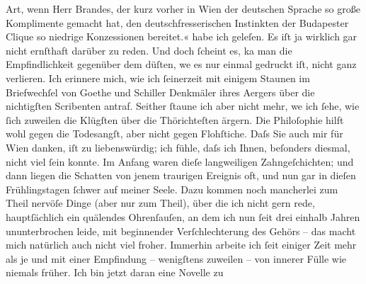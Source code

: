 \begin{ledgroupsized}[t]{13cm}
{{{                     Art, wenn Herr Brandes, der kurz vorher
                     in Wien der deutschen Sprache so große
                     Komplimente gemacht hat, den deutschfresserischen Instinkten der Budapester Clique so niedrige Konzessionen
                     bereitet.«}}}\label{K_L01034_4h} habe ich geleſen. Es iſt ja wirklich gar nicht
               ernſthaft darüber zu reden. Und doch ſcheint es, ka{\geminationn} man
               die Empfindlichkeit gegenüber dem dü{\geminationm}ſten, we{\geminationn} es nur einmal gedruckt iſt, nicht ganz verlieren. Ich
               erinnere mich, wie ich ſeinerzeit mit einigem Staunen im Briefwechſel von Goethe und Schiller Denkmäler ihres Aergers über die nichtigſten Scribenten antraf.
               Seither ſtaune ich {\pb}aber nicht mehr, we{\geminationn} ich ſehe, wie ſich zuweilen die Klügſten über die
               Thörichteſten ärgern. Die Philoſophie hilft wohl gegen die Todesangſt, aber nicht
               gegen Flohſtiche.\pend
           \pstart
           Daſs Sie auch mir für Wien danken, iſt zu
               liebenswürdig; ich fühle, daſs ich Ihnen, beſonders diesmal, nicht viel ſein konnte.
               Im Anfang waren dieſe langweiligen Zahngeſchichten; und dann liegen die Schatten von
               jenem traurigen Ereignis oft, und nun gar in dieſen Frühlingstagen ſchwer auf meiner
               Seele. Dazu kommen noch mancherlei zum {\pb}Theil
               nervöſe Dinge (aber nur zum Theil), über die ich nicht gern rede, hauptſächlich ein
               quälendes Ohrenſauſen, an dem ich nun ſeit drei einhalb Jahren ununterbrochen leide,
               mit beginnender Verſchlechterung des Gehörs – das macht mich natürlich auch nicht
               viel froher. Immerhin arbeite ich ſeit einiger Zeit mehr als je und mit einer
               Empfindung – wenigſtens zuweilen – von innerer Fülle wie niemals früher. Ich bin
               jetzt daran eine Novelle zu

\end{ledgroupsized}
